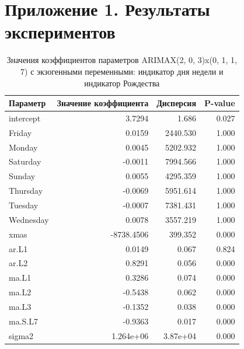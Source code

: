 ﻿\chapter{Приложение 1. Результаты экспериментов}

\begin{table}[h]%
    \caption{Значения коэффициентов параметров ARIMAX(2, 0, 3)x(0, 1, 1, 7) с экзогенными переменными: индикатор дня недели и индикатор Рождества}
    \centering
    \begin{tabular}{|l|r||r|r|}
        \hline
            Параметр           &     Значение коэффициента  &  Дисперсия  &  P-value \\
        \hline
            intercept          &     3.7294                 &     1.686 &   0.027 \\
            Friday             &     0.0159                 &  2440.530 &   1.000 \\
            Monday             &     0.0045                 &  5202.932 &   1.000 \\
            Saturday           &    -0.0011                 &  7994.566 &   1.000 \\
            Sunday             &     0.0055                 &  4295.359 &   1.000 \\
            Thursday           &    -0.0069                 &  5951.614 &   1.000 \\
            Tuesday            &    -0.0007                 &  7381.431 &   1.000 \\
            Wednesday          &     0.0078                 &  3557.219 &   1.000 \\
            xmas               & -8738.4506                 &   399.352 &   0.000 \\
            ar.L1              &     0.0149                 &     0.067 &   0.824 \\
            ar.L2              &     0.8291                 &     0.056 &   0.000 \\
            ma.L1              &     0.3286                 &     0.074 &   0.000 \\
            ma.L2              &    -0.5438                 &     0.062 &   0.000 \\
            ma.L3              &    -0.1352                 &     0.038 &   0.000 \\
            ma.S.L7            &    -0.9363                 &     0.017 &   0.000 \\
            sigma2             &  1.264e+06                 &  3.87e+04 &   0.000 \\
        \hline
    \end{tabular}
    \label{tbl:arimax_coeffs_exogen}
\end{table}


